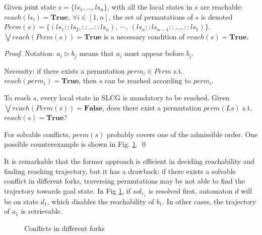 \documentclass[runningheads]{llncs}
\begin{document}
\begin{proposition}\label{theoperm}
Given joint state $s=\{ls_1,\ldots,ls_n\}$, with all the local states in $s$ are reachable: $reach (ls_i)=\mathbf{True},\ \forall i\in[1,n]$, the set of permutations of $s$ is denoted $Perm (s)=\{(ls_1::ls_2,::\ldots ::ls_n),\ \cdots,\ (ls_n::ls_{n-1}::\ldots,::ls_1)\}$. $\bigvee reach (Perm (s))=\mathbf{True}$ is a necessary condition of $reach (s)=\mathbf{True}$.
\end{proposition}
\begin{proof}
Notation: $a_i\triangleright b_j$ means that $a_i$ must appear before $b_j$.

Necessity: if there exists a permutation $perm_i\in Perm$ s.t. $reach (perm_i)=\mathbf{True}$, then $s$ can be reached according to $perm_i$.

To reach $s$, every local state in SLCG is mandatory to be reached.
Given $\bigvee reach (Perm (s))=\mathbf{False}$, does there exist a permutation $perm (Ls)$ s.t. $reach (s)=\mathbf{True}$?

For solvable conflicts, $perm(s)$ probably covers one of the admissible order.
One possible counterexample is shown in Fig. \ref{FigConflictInForks}. %
\qed\end{proof}

It is remarkable that the former approach is efficient in deciding reachability and finding reaching trajectory, but it has a drawback: if there exists a solvable conflict in different forks, traversing permutations may be not able to find the trajectory towards goal state.
In Fig \ref{FigConflictInForks}, if $sol_{c_1}$ is resolved first, automaton $d$ will be on state $d_1$, which disables the reachability of $b_1$.
In other cases, the trajectory of $a_1$ is retrievable.%
\begin{figure}[ht]
\centering

\caption{Conflicts in different forks}\label{FigConflictInForks}
\end{figure}
\end{document}
